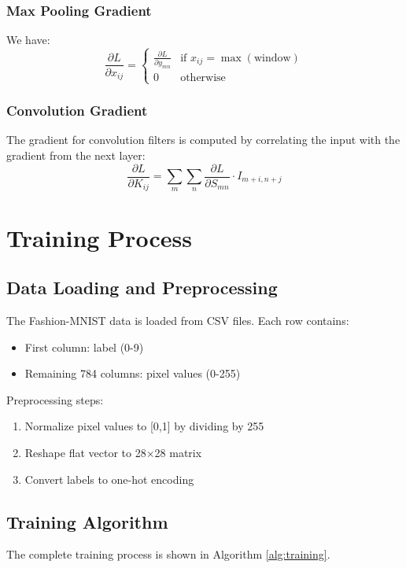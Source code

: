 \documentclass[conference]{IEEEtran}
\begin{document}
\subsubsection{Max Pooling Gradient}
We have:
\begin{equation}
    \frac{\partial L}{\partial x_{ij}} = 
    \begin{cases}
        \frac{\partial L}{\partial y_{mn}} & \text{if } x_{ij} = \max(\text{window})\\
        0 & \text{otherwise}
    \end{cases}
\end{equation}

\subsubsection{Convolution Gradient}
The gradient for convolution filters is computed by correlating the input with the gradient from the next layer:
\begin{equation}
    \frac{\partial L}{\partial K_{ij}} = \sum_m \sum_n \frac{\partial L}{\partial S_{mn}} \cdot I_{m+i,n+j}
\end{equation}

\section{Training Process}

\subsection{Data Loading and Preprocessing}
The Fashion-MNIST data is loaded from CSV files. Each row contains:
\begin{itemize}
    \item First column: label (0-9)
    \item Remaining 784 columns: pixel values (0-255)
\end{itemize}

Preprocessing steps:
\begin{enumerate}
    \item Normalize pixel values to [0,1] by dividing by 255
    \item Reshape flat vector to 28×28 matrix
    \item Convert labels to one-hot encoding
\end{enumerate}

\subsection{Training Algorithm}
The complete training process is shown in Algorithm \ref{alg:training}.
\end{document}
